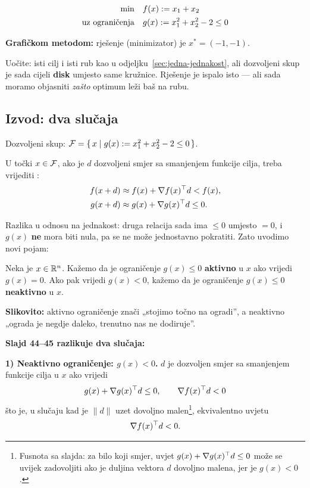 \begin{equation}
\begin{aligned}
\min \quad & f(x) := x_1 + x_2 \\
\uzogr & g(x) := x_1^2 + x_2^2 - 2 \le 0
\end{aligned}
\end{equation}

\textbf{Grafičkom metodom:} rješenje (minimizator) je $x^{*} = (-1,-1)$.

Uočite: isti cilj i isti rub kao u odjeljku~\ref{sec:jedna-jednakost}, ali
dozvoljeni skup je sada cijeli \textbf{disk} umjesto same kružnice. Rješenje je
ispalo isto --- ali sada moramo objasniti \emph{zašto} optimum leži baš na rubu.

\subsection{Izvod: dva slučaja}

Dozvoljeni skup: $\Feas = \{\, x \mid g(x) := x_1^2 + x_2^2 - 2 \le 0 \,\}$.

U točki $x \in \Feas$, ako je $d$ dozvoljeni smjer sa smanjenjem funkcije cilja,
treba vrijediti :
\begin{align}
f(x+d) &\approx f(x) + \nabla f(x)\T d < f(x), \\
g(x+d) &\approx g(x) + \nabla g(x)\T d \le 0.
\end{align}

Razlika u odnosu na jednakost: druga relacija sada ima $\le 0$ umjesto $= 0$, i
$g(x)$ \textbf{ne} mora biti nula, pa se ne može jednostavno pokratiti. Zato
uvodimo novi pojam:

\begin{definicija}
Neka je $x \in \R^n$. Kažemo da je ograničenje $g(x) \le 0$ \textbf{aktivno} u
$x$ ako vrijedi $g(x) = 0$. Ako pak vrijedi $g(x) < 0$, kažemo da je ograničenje
$g(x) \le 0$ \textbf{neaktivno} u $x$.
\end{definicija}

\textbf{Slikovito:} aktivno ograničenje znači „stojimo točno na ogradi”, a
neaktivno „ograda je negdje daleko, trenutno nas ne dodiruje”.

\textbf{Slajd 44--45 razlikuje dva slučaja:}

\textbf{1) Neaktivno ograničenje: $g(x) < 0$.}
$d$ je dozvoljen smjer sa smanjenjem funkcije cilja u $x$ ako vrijedi
\[
g(x) + \nabla g(x)\T d \le 0, \qquad \nabla f(x)\T d < 0
\]
što je, u slučaju kad je $\|d\|$ uzet dovoljno malen\footnote{Fusnota sa slajda:
za bilo koji smjer, uvjet $g(x) + \nabla g(x)\T d \le 0$ može se uvijek
zadovoljiti ako je duljina vektora $d$ dovoljno malena, jer je $g(x) < 0$.},
ekvivalentno uvjetu
\[
\nabla f(x)\T d < 0.
\]


